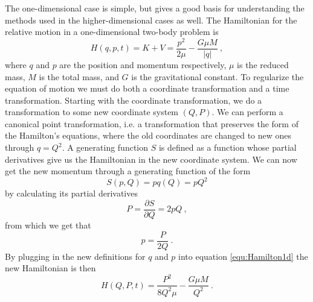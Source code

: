 \documentclass[english, oneside]{HYgradu}
\begin{document}
The one-dimensional case is simple, but gives a good basis for understanding the methods used in the higher-dimensional cases as well. The Hamiltonian for the relative motion in a one-dimensional two-body problem is
\begin{equation} \label{equ:Hamilton1d}
H(q,p,t) = K + V = \frac{p^2}{2 \mu} - \frac{G \mu M}{\left| q \right|} \ ,
\end{equation}
where $q$ and $p$ are the position and momentum respectively, $\mu$ is the reduced mass, $M$ is the total mass, and $G$ is the gravitational constant. 
To regularize the equation of motion we must do both a coordinate transformation and a time transformation. Starting with the coordinate transformation, we do a transformation to some new coordinate system $(Q, P)$. We can perform a canonical point transformation, i.e. a transformation that preserves the form of the Hamilton's equations, where the old coordinates are changed to new ones through $q = Q^2$. A generating function $S$ is defined as a function whose partial derivatives give us the Hamiltonian in the new coordinate system. We can now get the new momentum through a generating function of the form
\begin{equation}
S(p,Q) = pq(Q) = pQ^2
\end{equation}
by calculating its partial derivatives
\begin{equation}
P = \frac{\partial S}{\partial Q} = 2pQ \ ,
\end{equation}
from which we get that
\begin{equation}
p = \frac{P}{2Q} \ .
\end{equation}
By plugging in the new definitions for $q$ and $p$ into equation \ref{equ:Hamilton1d} the new Hamiltonian is then
\begin{equation}
H(Q,P,t) = \frac{P^2}{8Q^2 \mu} - \frac{G \mu M}{Q^2} \ .
\end{equation}
\end{document}
